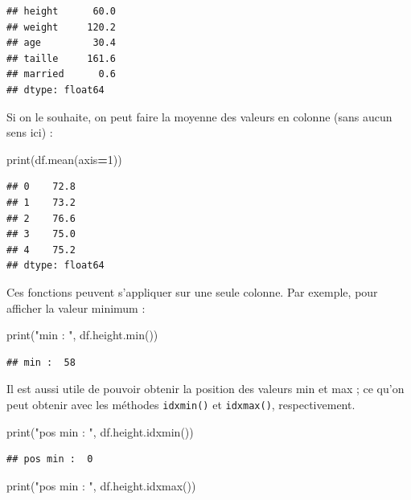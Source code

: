 \documentclass[12pt,]{book}
\newenvironment{Shaded}{\begin{snugshade}}{\end{snugshade}}
\newcommand{\DecValTok}[1]{\textcolor[rgb]{0.00,0.00,0.81}{#1}}
\newcommand{\StringTok}[1]{\textcolor[rgb]{0.31,0.60,0.02}{#1}}
\newcommand{\OperatorTok}[1]{\textcolor[rgb]{0.81,0.36,0.00}{\textbf{#1}}}
\newcommand{\BuiltInTok}[1]{#1}
\newcommand{\NormalTok}[1]{#1}
\numberwithin{equation}{section}
\numberwithin{countremarque}{section}
\begin{document}
\begin{lstlisting}
## height      60.0
## weight     120.2
## age         30.4
## taille     161.6
## married      0.6
## dtype: float64
\end{lstlisting}

Si on le souhaite, on peut faire la moyenne des valeurs en colonne (sans
aucun sens ici) :

\begin{Shaded}
\begin{Highlighting}[]
\BuiltInTok{print}\NormalTok{(df.mean(axis}\OperatorTok{=}\DecValTok{1}\NormalTok{))}
\end{Highlighting}
\end{Shaded}

\begin{lstlisting}
## 0    72.8
## 1    73.2
## 2    76.6
## 3    75.0
## 4    75.2
## dtype: float64
\end{lstlisting}

Ces fonctions peuvent s'appliquer sur une seule colonne. Par exemple,
pour afficher la valeur minimum :

\begin{Shaded}
\begin{Highlighting}[]
\BuiltInTok{print}\NormalTok{(}\StringTok{"min : "}\NormalTok{, df.height.}\BuiltInTok{min}\NormalTok{())}
\end{Highlighting}
\end{Shaded}

\begin{lstlisting}
## min :  58
\end{lstlisting}

Il est aussi utile de pouvoir obtenir la position des valeurs min et max
; ce qu'on peut obtenir avec les méthodes \texttt{idxmin()} et
\texttt{idxmax()}, respectivement.

\begin{Shaded}
\begin{Highlighting}[]
\BuiltInTok{print}\NormalTok{(}\StringTok{"pos min : "}\NormalTok{, df.height.idxmin())}
\end{Highlighting}
\end{Shaded}

\begin{lstlisting}
## pos min :  0
\end{lstlisting}

\begin{Shaded}
\begin{Highlighting}[]
\BuiltInTok{print}\NormalTok{(}\StringTok{"pos min : "}\NormalTok{, df.height.idxmax())}
\end{Highlighting}
\end{Shaded}
\end{document}
